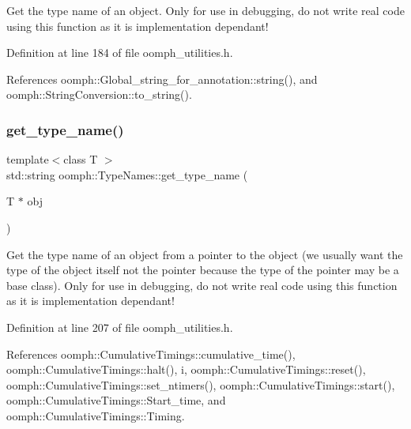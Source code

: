 Get the type name of an object. Only for use in debugging, do not write real code using this function as it is implementation dependant! 



Definition at line 184 of file oomph\+\_\+utilities.\+h.



References oomph\+::\+Global\+\_\+string\+\_\+for\+\_\+annotation\+::string(), and oomph\+::\+String\+Conversion\+::to\+\_\+string().

\mbox{\label{namespaceoomph_1_1TypeNames_ab0532785ab096d82cdec476b948da06f}} 
\subsubsection{\texorpdfstring{get\+\_\+type\+\_\+name()}{get\_type\_name()}\hspace{0.1cm}{\footnotesize\ttfamily [2/2]}}
{\footnotesize\ttfamily template$<$class T $>$ \\
std\+::string oomph\+::\+Type\+Names\+::get\+\_\+type\+\_\+name (\begin{DoxyParamCaption}\item[{T $\ast$}]{obj }\end{DoxyParamCaption})}



Get the type name of an object from a pointer to the object (we usually want the type of the object itself not the pointer because the type of the pointer may be a base class). Only for use in debugging, do not write real code using this function as it is implementation dependant! 



Definition at line 207 of file oomph\+\_\+utilities.\+h.



References oomph\+::\+Cumulative\+Timings\+::cumulative\+\_\+time(), oomph\+::\+Cumulative\+Timings\+::halt(), i, oomph\+::\+Cumulative\+Timings\+::reset(), oomph\+::\+Cumulative\+Timings\+::set\+\_\+ntimers(), oomph\+::\+Cumulative\+Timings\+::start(), oomph\+::\+Cumulative\+Timings\+::\+Start\+\_\+time, and oomph\+::\+Cumulative\+Timings\+::\+Timing.

